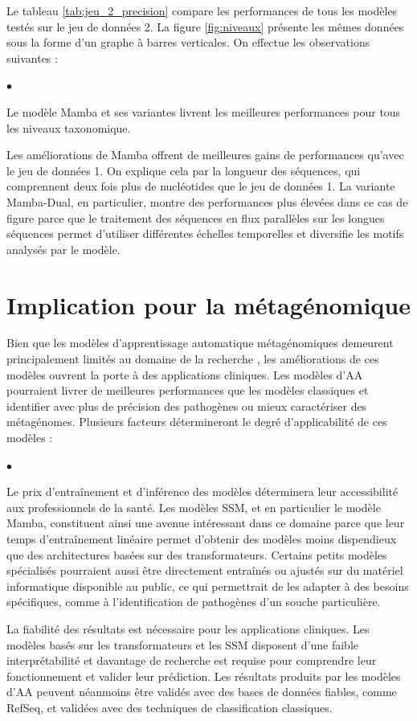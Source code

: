 Le tableau \ref{tab:jeu_2_precision} compare les performances de tous les modèles testés sur le
jeu de données 2. La figure \ref{fig:niveaux} présente les mêmes données sous la forme d'un graphe
à barres verticales. On effectue les observations suivantes :

\begin{list}{$\bullet$}{}
    \item Le modèle Mamba et ses variantes livrent les meilleures performances pour tous les niveaux
        taxonomique.
    \item Les améliorations de Mamba offrent de meilleures gains de performances qu'avec le jeu de
        données 1. On explique cela par la longueur des séquences, qui comprennent deux fois plus de
        nucléotides que le jeu de données 1. La variante Mamba-Dual, en particulier, montre des
        performances plus élevées dans ce cas de figure parce que le traitement des séquences en
        flux parallèles sur les longues séquences permet d'utiliser différentes échelles temporelles
        et diversifie les motifs analysés par le modèle.
\end{list}

\section{Implication pour la métagénomique}
Bien que les modèles d'apprentissage automatique métagénomiques demeurent principalement limités au
domaine de la recherche \cite{roy2024}, les améliorations de ces modèles ouvrent la porte à des
applications cliniques. Les modèles d'AA pourraient livrer de meilleures performances que les
modèles classiques et identifier avec plus de précision des pathogènes ou mieux caractériser des
métagénomes. Plusieurs facteurs détermineront le degré d'applicabilité de ces modèles :

\begin{list}{$\bullet$}{}
    \item Le prix d'entraînement et d'inférence des modèles déterminera leur accessibilité aux
        professionnels de la santé. Les modèles SSM, et en particulier le modèle Mamba, constituent
        ainsi une avenue intéressant dans ce domaine parce que leur temps d'entraînement linéaire
        permet d'obtenir des modèles moins dispendieux que des architectures basées sur des
        transformateurs. Certains petits modèles spécialisés pourraient aussi être directement
        entraînés ou ajustés sur du matériel informatique disponible au public, ce qui permettrait
        de les adapter à des besoins spécifiques, comme à l'identification de pathogènes d'un souche
        particulière.
    \item La fiabilité des résultats est nécessaire pour les applications cliniques. Les modèles
        basés sur les transformateurs et les SSM disposent d'une faible interprétabilité et
        davantage de recherche est requise pour comprendre leur fonctionnement et valider leur
        prédiction. Les résultats produits par les modèles d'AA peuvent néanmoins être validés avec
        des bases de données fiables, comme RefSeq, et validées avec des techniques de
        classification classiques.
\end{list}

